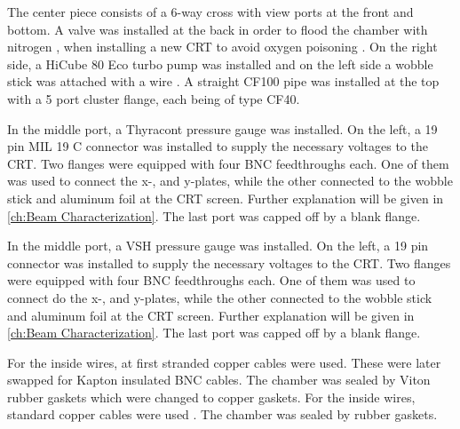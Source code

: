 The center piece consists of a 6-way cross with view ports at the front and bottom. A valve was installed at the back in order to flood the chamber with nitrogen , when installing a new CRT to avoid oxygen poisoning . On the right side, a HiCube 80 Eco turbo pump was installed and on the left side a wobble stick was attached with a wire . A straight CF100 pipe  was installed at the top with a 5 port cluster flange, each being of type CF40.
 
In the middle port, a Thyracont  pressure gauge was installed. On the left, a 19 pin MIL 19 C connector was installed to supply the necessary voltages to the CRT. Two flanges were equipped with four BNC feedthroughs each. One of them was used to connect the x-, and y-plates, while the other connected to the wobble stick and aluminum foil at the CRT screen. Further explanation will be given in \cref{ch:Beam Characterization}. The last port was capped off by a blank flange.

In the middle port, a VSH   pressure gauge was installed. On the left, a 19 pin connector   was installed to supply the necessary voltages to the CRT. Two flanges were equipped with four BNC feedthroughs each. One of them was used to connect do the x-, and y-plates, while the other connected to the wobble stick and aluminum foil at the CRT screen. Further explanation will be given in \cref{ch:Beam Characterization}. The last port was capped off by a blank flange.
 
For the inside wires, at first stranded copper cables were used. These were later swapped for Kapton insulated BNC cables. The chamber was sealed by Viton rubber gaskets which were changed to copper gaskets.
For the inside wires, standard copper cables were used . The chamber was sealed by rubber  gaskets.
 
